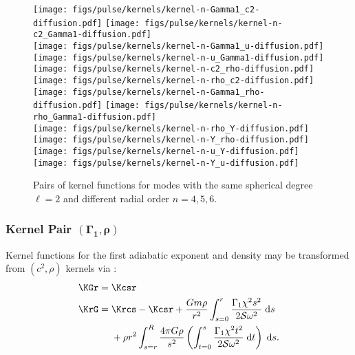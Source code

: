 \begin{figure}
    \centering
    \texttt{[image: figs/pulse/kernels/kernel-n-Gamma1\_c2-diffusion.pdf]}%
    \texttt{[image: figs/pulse/kernels/kernel-n-c2\_Gamma1-diffusion.pdf]}\\
    \texttt{[image: figs/pulse/kernels/kernel-n-Gamma1\_u-diffusion.pdf]}%
    \texttt{[image: figs/pulse/kernels/kernel-n-u\_Gamma1-diffusion.pdf]}\\
    \texttt{[image: figs/pulse/kernels/kernel-n-c2\_rho-diffusion.pdf]}%
    \texttt{[image: figs/pulse/kernels/kernel-n-rho\_c2-diffusion.pdf]}\\
    \texttt{[image: figs/pulse/kernels/kernel-n-Gamma1\_rho-diffusion.pdf]}%
    \texttt{[image: figs/pulse/kernels/kernel-n-rho\_Gamma1-diffusion.pdf]}\\
    \texttt{[image: figs/pulse/kernels/kernel-n-rho\_Y-diffusion.pdf]}%
    \texttt{[image: figs/pulse/kernels/kernel-n-Y\_rho-diffusion.pdf]}\\
    \texttt{[image: figs/pulse/kernels/kernel-n-u\_Y-diffusion.pdf]}%
    \texttt{[image: figs/pulse/kernels/kernel-n-Y\_u-diffusion.pdf]}
    \caption[Kernel functions (same $\ell$, different $n$)]{Pairs of kernel functions for modes with the same spherical degree ${\ell=2}$ and different radial order ${n=4},5,6$. \label{fig:same-ell}}
\end{figure}%

\subsubsection*{Kernel Pair \texorpdfstring{$\mathbf{(\Gamma_1, \rho)}$}{(Gamma1,rho)}}
\noindent
Kernel functions for the first adiabatic exponent and density may be transformed from ${(c^2, \rho)}$ kernels via \citep[e.g.][Equations~104-105]{InversionKit}:
\begin{align}
    \KGr ={} & \Kcsr
\\  \KrG ={} & \Krcs - \Kcsr + \frac{G m \rho}{r^2} \int_{s=0}^r \frac{\Gamma_1 \chi^2 s^2}{2 \mathcal{S} \omega^2} \; \text{d}s
\\\notag   &+ \rho r^2 \int_{s=r}^R \frac{4\pi G \rho}{s^2} \left( \int_{t=0}^s \frac{\Gamma_1 \chi^2 t^2}{2 \mathcal{S} \omega^2} \; \text{d}t \right) \; \text{d}s.
\end{align}

